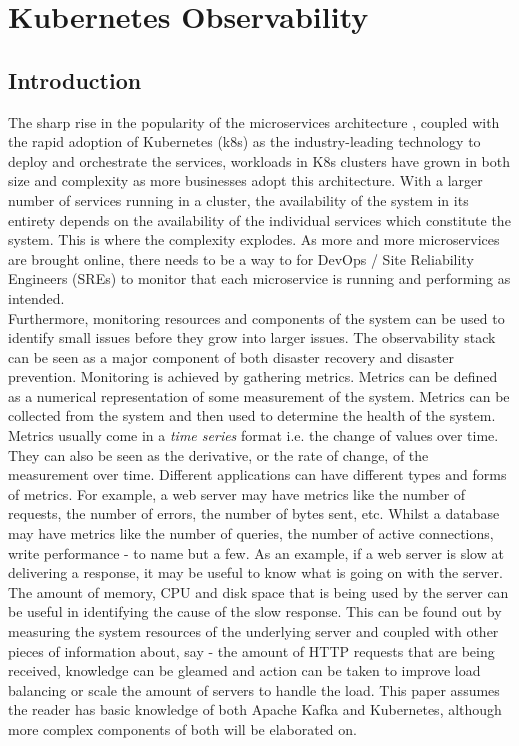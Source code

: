 \chapter{Kubernetes Observability}

\label{chap:intro}


\section{Introduction}
The sharp rise in the popularity of the microservices architecture \autocite{ReillyMicroservicesAdoption2020}, coupled with
the rapid adoption of Kubernetes (k8s) as the industry-leading technology to deploy and orchestrate
the services, workloads in K8s clusters have grown in both size and complexity as more businesses adopt this architecture.
\bigbreak
With a larger number of services running in a cluster, the availability of the system in its entirety
depends on the availability of the individual services which constitute the system. This is where the
complexity explodes. As more and more microservices are brought online, there needs to be a way to
for DevOps / Site Reliability Engineers (SREs) to monitor that each microservice is running and performing
as intended. \\ Furthermore, monitoring resources and components of the system can be used to identify
small issues before they grow into larger issues. The observability stack can be seen as a major component of
both disaster recovery and disaster prevention.
\bigbreak
Monitoring is achieved by gathering metrics. Metrics can be defined as a numerical representation of some
measurement of the system. Metrics can be collected from the system and then used to determine the health
of the system. Metrics usually come in a \emph{time series} format i.e. the change of values over time.
They can also be seen as the derivative, or the rate of change, of the measurement over time.
\bigbreak
Different applications can have different types and forms of metrics. For example, a web server may have
metrics like the number of requests, the number of errors, the number of bytes sent, etc.
Whilst a database may have metrics like the number of queries, the number of active connections, write performance - to name but a few.
\bigbreak
As an example, if a web server is slow at delivering a response, it may be useful to know what is going on with the
server. The amount of memory, CPU and disk space that is being used by the server can be useful in identifying
the cause of the slow response. This can be found out by measuring the system resources of the underlying server
and coupled with other pieces of information about, say - the amount of HTTP requests that are being received, knowledge can be
gleamed and action can be taken to improve load balancing or scale the amount of servers to handle the load.
\bigbreak
This paper assumes the reader has basic knowledge of both Apache Kafka and Kubernetes, although more complex components of both will
be elaborated on.
